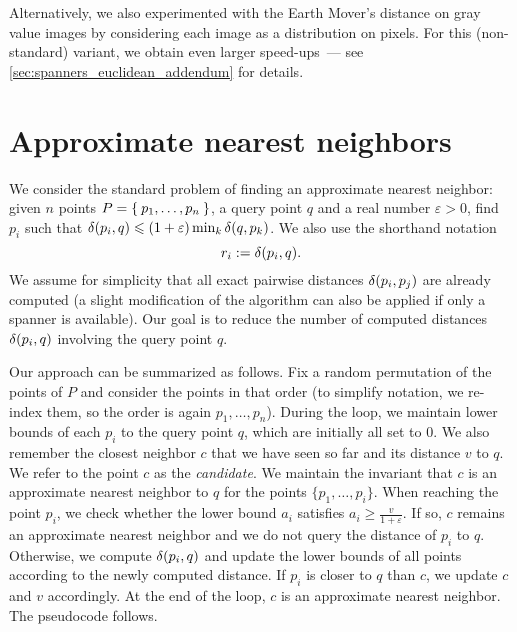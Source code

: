 \documentclass[]{ws-ijcga}
\renewcommand{\leq}{\leqslant}
\renewcommand{\geq}{\geqslant}
\newcommand{\eps}{\varepsilon}
\begin{document}
Alternatively, we also experimented with the Earth Mover’s distance on
gray value images by considering each image as a distribution on pixels.
For this (non-standard) variant, we obtain even larger speed-ups~--- see
\ref{sec:spanners_euclidean_addendum} for details.


\section{Approximate nearest neighbors}
\label{sec:ann}
We consider the standard problem of finding an approximate nearest neighbor: given
$n$ points $P = \Set{p_1, \dots, p_n}$, a query point $q$ and a real number $\eps > 0$,
find $p_i$ such that $\dist(p_i, q) \leq (1 + \eps) \min_{k} \dist(q, p_k)$. We also use the shorthand notation
\[
    r_i := \delta(p_i, q).
\]
We assume for simplicity
that all exact pairwise distances $\delta(p_i, p_j)$ are already computed
(a slight modification of the algorithm can also be applied if only a spanner is available).
Our goal is to reduce the number of computed distances $\delta(p_i, q)$ involving the query point $q$.

Our approach can be summarized as follows. 
Fix a random permutation of the points of $P$ 
and consider the points in that order 
(to simplify notation,
we re-index them, so the order is again $p_1, \dots, p_n$).
During the loop, we maintain lower bounds of each $p_i$
to the query point $q$, which are initially all set to $0$.
We also remember the closest neighbor $c$ that we have seen so
far and its distance $v$ to $q$.
We refer to the point $c$ as the \emph{candidate}.
We maintain the invariant that $c$ is an approximate nearest neighbor
to $q$ for the points $\{p_1,\ldots,p_i\}$.
When reaching the point $p_i$, we check whether the lower
bound $a_i$ satisfies $a_i\geq \frac{v}{1+\eps}$.
If so, $c$ remains an approximate nearest neighbor and
we do not query the distance of $p_i$ to $q$.
Otherwise, we compute $\delta(p_i,q)$ and update the lower bounds
of all points according to the newly computed distance.
If $p_i$ is closer to $q$ than $c$, we update $c$ and $v$
accordingly. At the end of the loop, $c$ is an approximate nearest
neighbor. The pseudocode follows.


\begin{algorithmic}
\label{alg:ann_blind}

\Function{ApproximateNearestNeighbor}{$P, q, \eps$}
    \State {}
        \If {$a_i \geq \frac{v}{1+\eps}$}
        \Else
            \State {}
            \EndIf
        \EndIf
    \EndFor
    \State {}
\EndFunction
\end{algorithmic}
\end{document}

